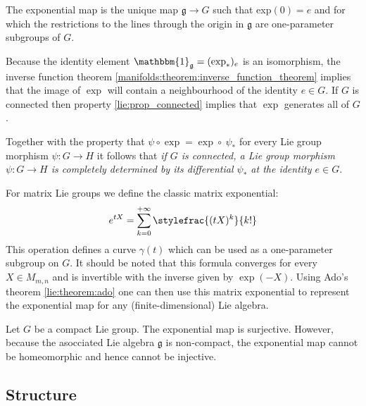 	\begin{property}
		The exponential map is the unique map $\mathfrak{g}\rightarrow G$ such that exp$(0) = e$ and for which the restrictions to the lines through the origin in $\mathfrak{g}$ are one-parameter subgroups of $G$.
	\end{property}
	\begin{result}\label{lie:exp_result}
		Because the identity element $\mathbbm{1}_\mathfrak{g} = (\exp_\ast)_e$ is an isomorphism, the inverse function theorem \ref{manifolds:theorem:inverse_function_theorem} implies that the image of $\exp$ will contain a neighbourhood of the identity $e\in G$. If $G$ is connected then property \ref{lie:prop_connected} implies that $\exp$ generates all of $G$.
		
		Together with the property that $\psi\circ\exp = \exp\circ\ \psi_\ast$ for every Lie group morphism $\psi:G\rightarrow H$ it follows that \textit{if $G$ is connected, a Lie group morphism $\psi:G\rightarrow H$ is completely determined by its differential $\psi_\ast$ at the identity $e\in G$}.
	\end{result}
	
	\begin{example}
		For matrix Lie groups we define the classic matrix exponential:
		\begin{equation}
			e^{tX} = \sum_{k=0}^{+\infty}\stylefrac{(tX)^k}{k!}
		\end{equation}
		This operation defines a curve $\gamma(t)$ which can be used as a one-parameter subgroup on $G$. It should be noted that this formula converges for every $X\in M_{m,n}$ and is invertible with the inverse given by $\exp(-X)$. Using Ado's theorem \ref{lie:theorem:ado} one can then use this matrix exponential to represent the exponential map for any (finite-dimensional) Lie algebra.
	\end{example}
	
	\begin{property}
		Let $G$ be a compact Lie group. The exponential map is surjective. However, because the asocciated Lie algebra $\mathfrak{g}$ is non-compact, the exponential map cannot be homeomorphic and hence cannot be injective.
	\end{property}

\subsection{Structure}  
        
